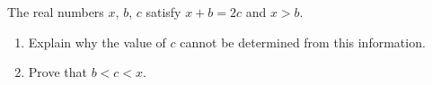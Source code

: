 The real numbers $x$, $b$, $c$ satisfy $x+b=2c$ and $x>b$.
\begin{enumerate}
\item[(a)] Explain why the value of $c$ cannot be determined from this information.
\item[(b)] Prove that $b<c<x$.
\end{enumerate}
